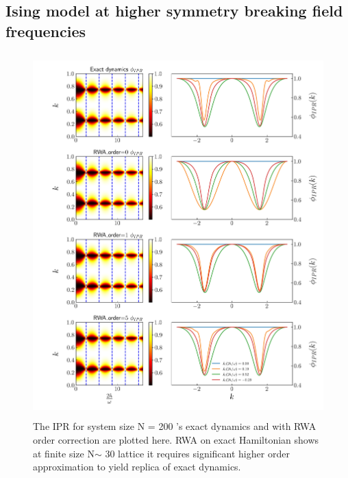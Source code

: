 \documentclass{article}
\begin{document}
\subsection{Ising model at higher symmetry breaking field frequencies}
\begin{figure}[ht!]
\centering
\includegraphics[height = 14.0cm, width = 12cm]{ising_ipr_exact_rwa_order_5_N_30.jpeg}
\caption{\color{blue}The IPR for system size N = 200 's exact dynamics and with RWA order correction are plotted here. RWA on exact Hamiltonian shows at finite size N$\sim$ 30 lattice it requires significant higher order approximation to yield replica of exact dynamics.}
\end{figure}
\end{document}
